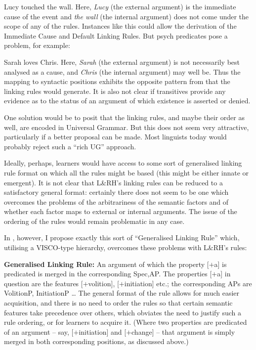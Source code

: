 \documentclass[output=paper]{langsci/langscibook}
\begin{document}
\ea Lucy touched the wall.\z
Here, \emph{Lucy} (the external argument) is the immediate cause of the event
and \emph{the wall} (the internal argument) does not come under the scope of
any of the rules. Instances like this could allow the derivation of the
Immediate Cause and Default Linking Rules. But psych predicates pose a problem,
for example:

\ea Sarah loves Chris.\z
Here, \emph{Sarah} (the external argument) is not necessarily best analysed as
a cause, and \emph{Chris} (the internal argument) may well be. Thus the mapping
to syntactic positions exhibits the opposite pattern from that the linking
rules would generate. It is also not clear if transitives provide any evidence
as to the status of an argument of which existence is asserted or denied.

One solution would be to posit that the linking rules, and maybe their order as
well, are encoded in Universal Grammar. But this does not seem very attractive,
particularly if a better proposal can be made. Most linguists today would
probably reject such a \enquote{rich \gls{UG}} approach.

Ideally, perhaps, learners would have access to some sort of generalised
linking rule format on which all the rules might be based (this might be either
innate or emergent). It is not clear that L\&RH’s linking rules can be reduced
to a satisfactory general format: certainly there does not seem to be one which
overcomes the problems of the arbitrariness of the semantic factors and of
whether each factor maps to external or internal arguments. The issue of the
ordering of the rules would remain problematic in any case.

In \textcite{Baker2018,Baker2019}, however, I propose exactly this sort of
\enquote{Generalised Linking Rule} which, utilising a VISCO-type hierarchy,
overcomes these problems with L\&RH’s rules:

\ea \textbf{Generalised Linking Rule:} An argument of which the property [$+$a]
    is predicated is merged in the corresponding Spec,AP.
\z
The properties [$+$a] in question are the features [$+$volition],
[$+$initiation] etc.; the corresponding APs are VolitionP, InitiationP \dots{}
The general format of the rule allows for much easier acquisition, and there is
no need to order the rules so that certain semantic features take precedence
over others, which obviates the need to justify such a rule ordering, or for
learners to acquire it. (Where two properties are predicated of an argument –
say, [$+$initiation] and [$+$change] – that argument is simply merged in both
corresponding positions, as discussed above.)
\end{document}
